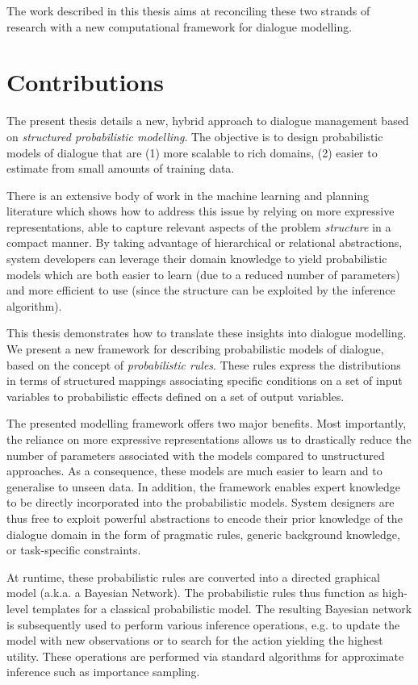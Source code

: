 The work described in this thesis aims at reconciling these two strands of research with a new computational framework for dialogue modelling. 

\section{Contributions}

The present thesis details a new, hybrid approach to dialogue management based on \textit{structured probabilistic modelling}.  The objective is to design probabilistic models of dialogue that are (1) more scalable to rich domains, (2) easier to estimate from small amounts of training data.

There is an extensive body of work in the machine learning and planning literature which shows how to address this issue by relying on more expressive representations, able to capture relevant aspects of the problem \textit{structure} in a compact manner. By taking advantage of hierarchical or relational abstractions, system developers can leverage their domain knowledge to yield probabilistic models which are both easier to learn (due to a reduced number of parameters) and more efficient to use (since the structure can be exploited by the inference algorithm).

This thesis demonstrates how to translate these insights into dialogue modelling. We present a new framework for describing probabilistic models of dialogue, based on the concept of \textit{probabilistic rules}.  These rules express the distributions in terms of structured mappings associating specific conditions on a set of input variables to probabilistic effects defined on a set of output variables. 

The presented modelling framework offers two major benefits. Most importantly, the reliance on more expressive representations allows us to drastically reduce the number of parameters associated with the models compared to unstructured approaches.  As a consequence, these models are much easier to learn and to generalise to unseen data. In addition, the framework enables expert knowledge to be directly incorporated into the probabilistic models. System designers are thus free to exploit powerful abstractions to encode their prior knowledge of the dialogue domain in the form of pragmatic rules, generic background knowledge, or task-specific constraints. 

At runtime, these probabilistic rules are converted into a directed graphical model (a.k.a. a Bayesian Network).  The probabilistic rules thus function as high-level templates for a classical probabilistic model.  The resulting Bayesian network is subsequently used to perform various inference operations, e.g. to update the model with new observations or to search for the action yielding the highest utility. These operations are performed via standard algorithms for approximate inference such as importance sampling.

